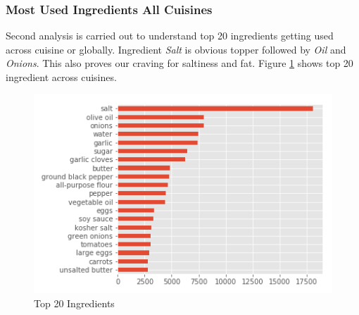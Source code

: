\documentclass[sigconf]{acmart}
\begin{document}
\subsubsection{Most Used Ingredients All Cuisines}
Second analysis is carried out to understand top 20 ingredients getting used across cuisine or globally. Ingredient \emph{Salt} is obvious topper followed by \emph{Oil} and \emph{Onions}. This also proves our craving for saltiness and fat. Figure \ref{f:Ingredient_Distribution} shows top 20 ingredient across cuisines. 
\begin{figure}[!ht]
  \centering\includegraphics[width=\columnwidth]{images/Ingredient_Distribution.png}
  \caption{Top 20 Ingredients }\label{f:Ingredient_Distribution}
\end{figure}
\end{document}
